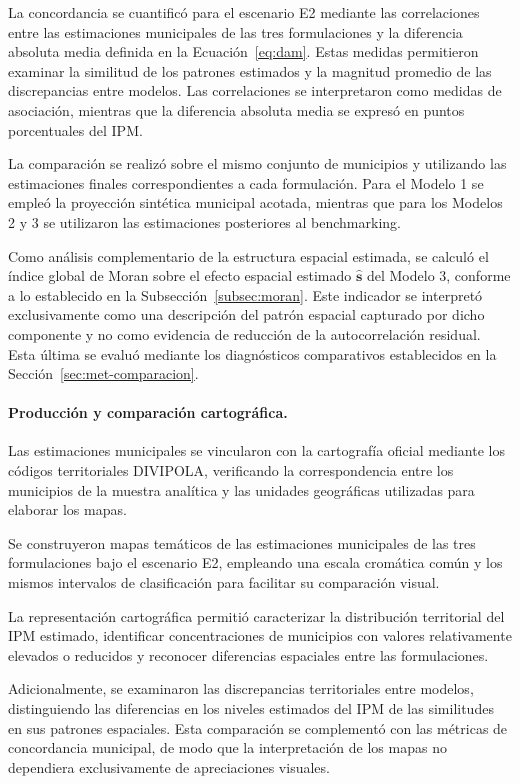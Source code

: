 La concordancia se cuantificó para el escenario E2 mediante las correlaciones entre las estimaciones municipales de las tres formulaciones y la diferencia absoluta media definida en la Ecuación~\ref{eq:dam}. Estas medidas permitieron examinar la similitud de los patrones estimados y la magnitud promedio de las discrepancias entre modelos. Las correlaciones se interpretaron como medidas de asociación, mientras que la diferencia absoluta media se expresó en puntos porcentuales del IPM.

La comparación se realizó sobre el mismo conjunto de municipios y utilizando las estimaciones finales correspondientes a cada formulación. Para el Modelo 1 se empleó la proyección sintética municipal acotada, mientras que para los Modelos 2 y 3 se utilizaron las estimaciones posteriores al benchmarking.

Como análisis complementario de la estructura espacial estimada, se calculó el índice global de Moran sobre el efecto espacial estimado $\widehat{\mathbf{s}}$ del Modelo 3, conforme a lo establecido en la Subsección~\ref{subsec:moran}. Este indicador se interpretó exclusivamente como una descripción del patrón espacial capturado por dicho componente y no como evidencia de reducción de la autocorrelación residual. Esta última se evaluó mediante los diagnósticos comparativos establecidos en la Sección~\ref{sec:met-comparacion}.

\paragraph{Producción y comparación cartográfica.}

Las estimaciones municipales se vincularon con la cartografía oficial mediante los códigos territoriales DIVIPOLA, verificando la correspondencia entre los municipios de la muestra analítica y las unidades geográficas utilizadas para elaborar los mapas.

Se construyeron mapas temáticos de las estimaciones municipales de las tres formulaciones bajo el escenario E2, empleando una escala cromática común y los mismos intervalos de clasificación para facilitar su comparación visual.

La representación cartográfica permitió caracterizar la distribución territorial del IPM estimado, identificar concentraciones de municipios con valores relativamente elevados o reducidos y reconocer diferencias espaciales entre las formulaciones.

Adicionalmente, se examinaron las discrepancias territoriales entre modelos, distinguiendo las diferencias en los niveles estimados del IPM de las similitudes en sus patrones espaciales. Esta comparación se complementó con las métricas de concordancia municipal, de modo que la interpretación de los mapas no dependiera exclusivamente de apreciaciones visuales.

